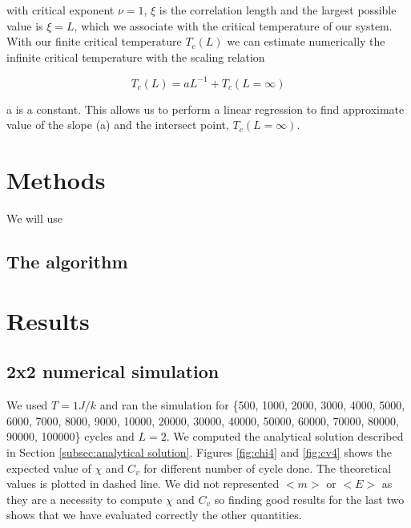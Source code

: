 \documentclass[english,notitlepage,reprint,nofootinbib]{revtex4-2}  %
\begin{document}
	with critical exponent $\nu=1$, $\xi$ is the correlation length and the largest possible 
	value is $\xi=L$, which we associate with the critical temperature of our system. \\
	
	With our finite critical temperature $T_c(L)$  we can estimate numerically the infinite
	critical temperature with the scaling relation 
	
	\begin{equation}
		T_c(L) = aL^{-1} + T_c(L=\infty) \label{eq:scaling relation}
	\end{equation}
	
	a is a constant. This allows us to perform a linear regression to find approximate value 
	of the slope (a) and the intersect point, $T_c(L=\infty)$.
	
	
	
	\section{Methods}\label{sec:methods}
	We will use

	
	\subsection*{The algorithm}\label{sec:algorithm}

	\section{Results}\label{sec:results}
	\subsection{2x2 numerical simulation}\label{subsec: 2x2 numerical}
	We used $T=1 J/k$ and ran the simulation for \{500, 1000, 2000, 3000, 4000, 5000, 6000, 
	7000, 8000, 9000, 10000, 20000, 30000, 40000, 50000, 60000, 70000, 80000, 90000, 100000\}
	cycles and $L=2$. We computed the analytical solution described in Section \ref{subsec:analytical solution}. 
	Figures \ref{fig:chi4} and \ref{fig:cv4} shows the expected value of $\chi$ and $C_v$ for different number of cycle done. The theoretical values is plotted in dashed line. We did
	not represented $<m>$ or $<E>$ as they are a necessity to compute $\chi$ and $C_v$ so 
	finding good results for the last two shows that we have evaluated correctly the other
	quantities. 
	
\end{document}
